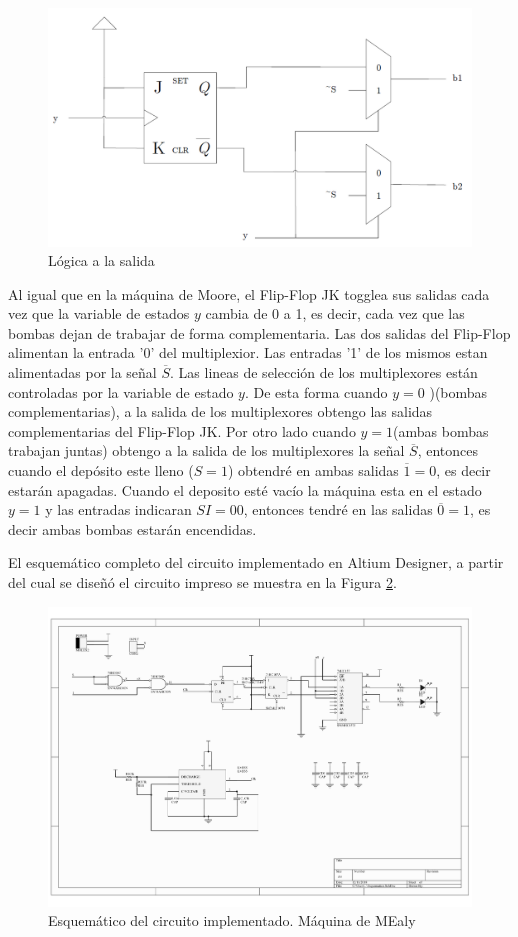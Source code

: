 \documentclass[10pt,a4paper]{article}
\begin{document}
\begin{figure}[H]
\centering
\includegraphics[scale=0.3]{images/multiplexion_mealy.png}
\caption{Lógica a la salida}
\label{1_salida_mealy}
\end{figure}

Al igual que en la máquina de Moore, el Flip-Flop JK togglea sus salidas cada vez que la variable de estados $y$ cambia de 0 a 1, es decir, cada vez que las bombas dejan de trabajar de forma complementaria. Las dos salidas del Flip-Flop alimentan la entrada '0' del multiplexior. Las entradas '1' de los mismos estan alimentadas por la señal $\overline{S}$. Las lineas de selección de los multiplexores están controladas por la variable de estado $y$. De esta forma cuando $y=0$ )(bombas complementarias), a la salida de los multiplexores obtengo las salidas complementarias del Flip-Flop JK. Por otro lado cuando $y=1$(ambas bombas trabajan juntas) obtengo a la salida de los multiplexores la señal $\overline{S}$, entonces cuando el depósito este lleno ($S=1$) obtendré en ambas salidas $\overline{1}=0$, es decir estarán apagadas. Cuando el deposito esté vacío la máquina esta en el estado $y=1$ y las entradas indicaran $SI=00$, entonces tendré en las salidas $\overline{0}=1$, es decir ambas bombas estarán encendidas.

El esquemático completo del circuito implementado en Altium Designer, a partir del cual se diseñó el circuito impreso se muestra en la Figura \ref{1_fig_esqm_mealy}.

\begin{figure}[H]
\centering
\includegraphics[scale=0.6]{images/Esquematico_Mealy.pdf}
\caption{Esquemático del circuito implementado. Máquina de MEaly}
\label{1_fig_esqm_mealy}
\end{figure}
\end{document}
